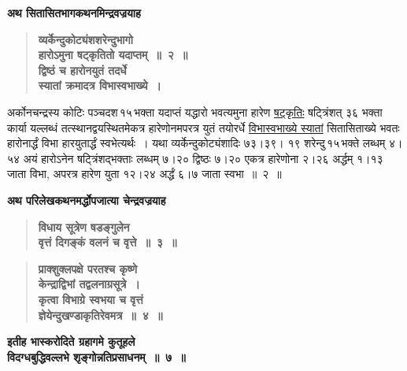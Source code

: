 \documentclass[11pt, openany]{book}
\begin{document}
\newpage

{\small \textbf{अथ सितासितभागकथनमिन्द्रवज्रयाह\textendash }}

 \label{7.2}
\begin{quote}
{\large \textbf{{\color{purple}व्यर्केन्दुकोट्यंशशरेन्दुभागो \\
हारोऽमुना षट्कृतितो यदाप्तम्~॥~२~॥ \\
द्विष्ठं च हारोनयुतं तदर्धे \\
स्यातां क्रमादत्र विभास्वभाख्ये~।}}}
\end{quote}

\begin{sloppypar}
अर्कोनचन्द्रस्य कोटिः पञ्चदश\textendash \,१५\textendash \,भक्ता यदाप्तं यद्धारो भवत्यमुना हारेण \hyperref[7.2]{षट्कृतिः} षट्त्रिंशत् ३६ भक्ता कार्या यल्लब्धं तत्स्थानद्वयस्थितमेकत्र हारेणोनमपरत्र युतं तयोरर्धे \hyperref[7.2]{विभास्वभाख्ये स्यातां} सितासिताख्ये भवतः हारोनार्द्धं विभा हारयुतार्द्धं स्वभेत्यर्थः~। यथा व्यर्केन्दुकोट्यंशादिः ७३।३९। १९ शरेन्दु\textendash \,१५\textendash \,भक्ते लब्धम् ४।५४ अयं हारोऽनेन षट्त्रिंशद्भक्ताः लब्धम् ७।२० द्विष्ठः ७।२० एकत्र हारेणोना २।२६ अर्द्धम् १।१३ जाता विभा, अपरत्र हारेण युता १२।२४ अर्द्धं ६।७ जाता स्वभा~॥~२~॥\\
\end{sloppypar}

{\small \textbf{अथ परिलेखकथनमर्द्धोपजात्या चेन्द्रवज्रयाह\textendash }}

 \label{7.3}
\begin{quote}
{\large \textbf{{\color{purple}विधाय सूत्रेण षडङ्गुलेन \\
वृत्तं दिगङ्कं वलनं च वृत्ते~॥~३~॥}}}
\end{quote}

\newpage

 \label{7.4}
\begin{quote}
{\large \textbf{{\color{purple}प्राक्शुक्लपक्षे परतश्च कृष्णे \\ 
केन्द्राद्विभां तद्वलनाग्रसूत्रे~। \\
कृत्वा विभाग्रे स्वभया च वृत्तं \\
ज्ञेयेन्दुखण्डाकृतिरेवमत्र~॥~४~॥}}}
\end{quote}

\begin{center}
{\large \textbf{इतीह भास्करोदिते ग्रहागमे कुतूहले \\
विदग्धबुद्धिवल्लभे शृङ्गोन्नतिप्रसाधनम्~॥~७~॥}}
\end{center}
\end{document}
